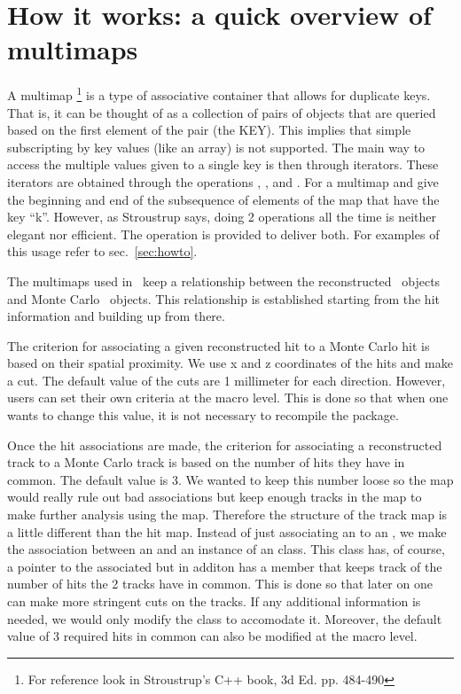 
\section{How it works: a quick overview of multimaps}
\label{sec:howitworks}
A multimap \footnote{For reference look in Stroustrup's C++ book, 3d Ed. pp. 484-490}  is a type of associative container that allows for duplicate keys.
That is, it can be thought of as a collection of pairs of objects that are queried based on the first
element of the pair (the KEY).   This implies that simple
subscripting by key values (like an array) is not supported.  The main way to access
the multiple values given to a single key is then through iterators.  These iterators
are obtained through the operations , , and
.
For a multimap  and  give the beginning
and end of the subsequence of elements of the map that have the key ``k''.  However,
as Stroustrup says, doing 2 operations all the time is neither elegant nor efficient.  The
operation  is provided to deliver both.  For examples of this usage 
refer to sec.~\ref{sec:howto}. 

The multimaps used in \StAssociationMaker\ 
keep a relationship between the reconstructed \StEvent\ objects and Monte Carlo
\StMcEvent\ objects.  This
relationship is established starting from the hit information and building up
from there.

The criterion for associating a given reconstructed hit to a 
Monte Carlo hit is based on their spatial proximity.  We use x and z coordinates
of the hits and make a cut.  The default value of the cuts are 1 millimeter for
each direction.  However, users can set their own criteria at the macro level.  This
is done so that when one wants to change this value, it is not necessary to recompile
the package.

Once the hit associations are made, the criterion for associating a
reconstructed track to a Monte Carlo track is 
based on the number of hits they have in common.  The default value is 3.  We wanted
to keep this number loose so the map would really rule out bad associations but keep
enough tracks in the map to make further analysis using the map.  Therefore the structure
of the track map is a little different than the hit map.  Instead of just associating an
 to an \name{StMcTrack}, we make the association between an
\name{StGlobalTrack} and an instance of an \name{StTrackPairInfo} class. 
This class has,
of course, a pointer to the associated  but in additon has a member that
keeps track of the number of hits the 2 tracks have in common.  This is done so that
later on one can make more stringent cuts on the tracks.  If any additional information
is needed, we would only modify the \name{StTrackPairInfo} class to accomodate it.  Moreover,
the default value of 3 required hits in common can also be modified at the macro level.

